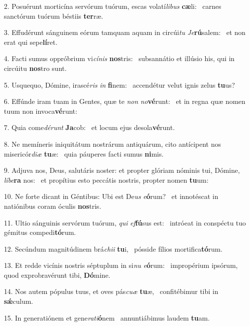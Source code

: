 2. Posuérunt morticína servórum tuórum, escas volatí\textit{li}\textit{bus} \textbf{cæ}li: \ast\  carnes sanctórum tuórum béstiis \textbf{ter}ræ.\

3. Effudérunt sánguinem eórum tamquam aquam in circúi\textit{tu} \textit{Je}\textbf{rú}salem: \ast\  et non erat qui sepe\textbf{lí}ret.\

4. Facti sumus oppróbrium vi\textit{cí}\textit{nis} \textbf{nos}tris: \ast\  subsannátio et illúsio his, qui in circúitu \textbf{nos}tro sunt.\

5. Usquequo, Dómine, irascé\textit{ris} \textit{in} \textbf{fi}nem: \ast\  accendétur velut ignis zelus \textbf{tu}us?\

6. Effúnde iram tuam in Gentes, quæ te \textit{non} \textit{no}\textbf{vé}runt: \ast\  et in regna quæ nomen tuum non invoca\textbf{vé}runt:\

7. Quia come\textit{dé}\textit{runt} \textbf{Ja}cob: \ast\  et locum ejus desola\textbf{vé}runt.\

8. Ne memíneris iniquitátum nostrárum antiquárum, cito antícipent nos misericór\textit{di}\textit{æ} \textbf{tu}æ: \ast\  quia páuperes facti sumus \textbf{ni}mis.\

9. Adjuva nos, Deus, salutáris noster: et propter glóriam nóminis tui, Dómine, \textit{lí}\textit{be}\textbf{ra} nos: \ast\  et propítius esto peccátis nostris, propter nomen \textbf{tu}um:\

10. Ne forte dicant in Géntibus: Ubi est De\textit{us} \textit{e}\textbf{ó}rum? \ast\  et innotéscat in natiónibus coram óculis \textbf{nos}tris.\

11. Ultio sánguinis servórum tuórum, \textit{qui} \textit{ef}\textbf{fú}sus est: \ast\  intróeat in conspéctu tuo gémitus compedi\textbf{tó}rum.\

12. Secúndum magnitúdinem brá\textit{chi}\textit{i} \textbf{tu}i, \ast\  pósside fílios mortifica\textbf{tó}rum.\

13. Et redde vicínis nostris séptuplum in si\textit{nu} \textit{e}\textbf{ó}rum: \ast\  impropérium ipsórum, quod exprobravérunt tibi, \textbf{Dó}mine.\

14. Nos autem pópulus tuus, et oves pás\textit{cu}\textit{æ} \textbf{tu}æ, \ast\  confitébimur tibi in \textbf{sǽ}culum.\

15. In generatiónem et gene\textit{ra}\textit{ti}\textbf{ó}nem \ast\  annuntiábimus laudem \textbf{tu}am.\

